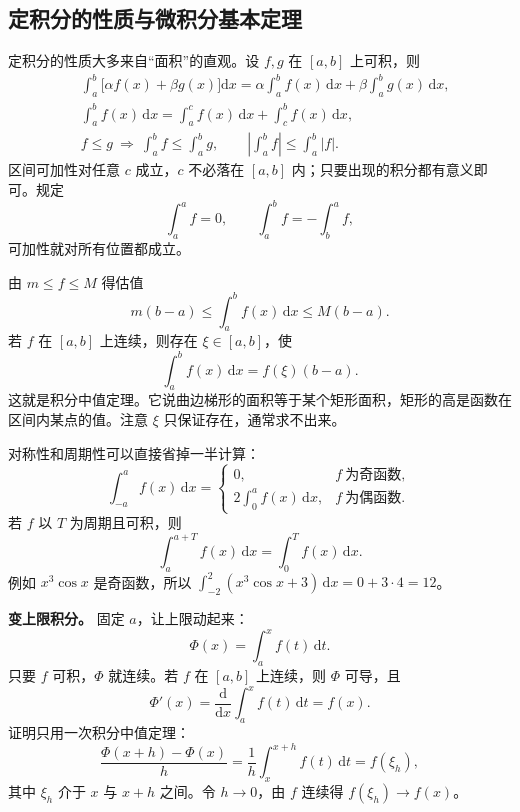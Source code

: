 \subsection{定积分的性质与微积分基本定理}

定积分的性质大多来自“面积”的直观。设 \(f,g\) 在 \([a,b]\) 上可积，则
\[
\begin{aligned}
&\int_a^b \bigl[\alpha f(x)+\beta g(x)\bigr]\mathrm{d}x
 =\alpha\int_a^b f(x)\,\mathrm{d}x+\beta\int_a^b g(x)\,\mathrm{d}x,\\
&\int_a^b f(x)\,\mathrm{d}x=\int_a^c f(x)\,\mathrm{d}x+\int_c^b f(x)\,\mathrm{d}x,\\
&f\le g\ \Rightarrow\ \int_a^b f\le\int_a^b g,\qquad
\left|\int_a^b f\right|\le\int_a^b|f| .
\end{aligned}
\]
区间可加性对任意 \(c\) 成立，\(c\) 不必落在 \([a,b]\) 内；只要出现的积分都有意义即可。规定
\[
  \int_a^a f=0,\qquad \int_a^b f=-\int_b^a f,
\]
可加性就对所有位置都成立。

由 \(m\le f\le M\) 得估值
\[
  m(b-a)\le\int_a^b f(x)\,\mathrm{d}x\le M(b-a).
\]
若 \(f\) 在 \([a,b]\) 上连续，则存在 \(\xi\in[a,b]\)，使
\[
  \int_a^b f(x)\,\mathrm{d}x=f(\xi)(b-a).
\]
这就是积分中值定理。它说曲边梯形的面积等于某个矩形面积，矩形的高是函数在区间内某点的值。注意 \(\xi\) 只保证存在，通常求不出来。

对称性和周期性可以直接省掉一半计算：
\[
  \int_{-a}^{a}f(x)\,\mathrm{d}x=
  \begin{cases}
    0, & f\ \text{为奇函数},\\[2pt]
    2\displaystyle\int_0^a f(x)\,\mathrm{d}x, & f\ \text{为偶函数}.
  \end{cases}
\]
若 \(f\) 以 \(T\) 为周期且可积，则
\[
  \int_a^{a+T}f(x)\,\mathrm{d}x=\int_0^T f(x)\,\mathrm{d}x .
\]
例如 \(x^3\cos x\) 是奇函数，所以 \(\int_{-2}^{2}(x^3\cos x+3)\,\mathrm{d}x=0+3\cdot4=12\)。

\noindent\textbf{变上限积分。} 固定 \(a\)，让上限动起来：
\[
  \Phi(x)=\int_a^x f(t)\,\mathrm{d}t .
\]
只要 \(f\) 可积，\(\Phi\) 就连续。若 \(f\) 在 \([a,b]\) 上连续，则 \(\Phi\) 可导，且
\[
  \Phi'(x)=\frac{\mathrm{d}}{\mathrm{d}x}\int_a^x f(t)\,\mathrm{d}t=f(x).
\]
证明只用一次积分中值定理：
\[
  \frac{\Phi(x+h)-\Phi(x)}{h}
  =\frac{1}{h}\int_x^{x+h}f(t)\,\mathrm{d}t=f(\xi_h),
\]
其中 \(\xi_h\) 介于 \(x\) 与 \(x+h\) 之间。令 \(h\to0\)，由 \(f\) 连续得 \(f(\xi_h)\to f(x)\)。

